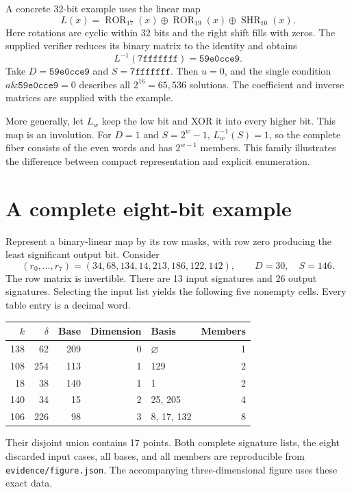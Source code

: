 \documentclass[11pt,a4paper]{article}
\theoremstyle{definition}\newtheorem{definition}[theorem]{Definition}
\newcommand{\andb}{\mathbin{\&}}
\begin{document}
A concrete 32-bit example uses the linear map
\begin{equation}\label{eq:map32}
L(x)=\operatorname{ROR}_{17}(x)\oplus\operatorname{ROR}_{19}(x)
       \oplus\operatorname{SHR}_{10}(x).
\end{equation}
Here rotations are cyclic within 32 bits and the right shift fills with
zeros. The supplied verifier reduces its binary matrix to the identity
and obtains
\[
L^{-1}(\mathtt{7fffffff})=\mathtt{59e0cce9}.
\]
Take $D=\mathtt{59e0cce9}$ and $S=\mathtt{7fffffff}$.
Then $u=0$, and the single condition
$a\andb\mathtt{59e0cce9}=0$ describes all $2^{16}=65{,}536$ solutions.
The coefficient and inverse matrices are supplied with the example.

More generally, let $L_w$ keep the low bit and XOR it into every higher
bit. This map is an involution. For $D=1$ and $S=2^w-1$,
$L_w^{-1}(S)=1$, so the complete fiber consists of the even words and
has $2^{w-1}$ members. This family illustrates the difference between
compact representation and explicit enumeration.

\section{A complete eight-bit example}
Represent a binary-linear map by its row masks, with row zero producing
the least significant output bit. Consider
\[
(r_0,\ldots,r_7)=(34,68,134,14,213,186,122,142),\qquad D=30,
\quad S=146.
\]
The row matrix is invertible. There are 13 input signatures and 26 output
signatures. Selecting the input list yields the following five nonempty
cells. Every table entry is a decimal word.
\begin{center}
\begin{tabular}{rrrrl r}
\toprule
$k$&$\delta$&Base&Dimension&Basis&Members\\
\midrule
138&62&209&0&$\varnothing$&1\\
108&254&113&1&129&2\\
18&38&140&1&1&2\\
140&34&15&2&25, 205&4\\
106&226&98&3&8, 17, 132&8\\
\bottomrule
\end{tabular}
\end{center}
Their disjoint union contains 17 points. Both complete signature lists,
the eight discarded input cases, all bases, and all members are
reproducible from \texttt{evidence/figure.json}. The accompanying
three-dimensional figure uses these exact data.
\end{document}
